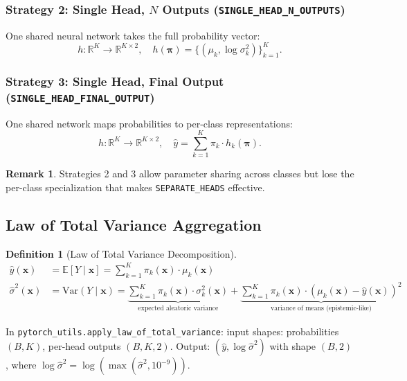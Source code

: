 \documentclass[11pt,a4paper]{article}
\theoremstyle{definition}
\newtheorem{definition}{Definition}[section]
\newtheorem{remark}{Remark}[section]
\newcommand{\E}{\mathbb{E}}
\newcommand{\Var}{\mathrm{Var}}
\newcommand{\R}{\mathbb{R}}
\newcommand{\bx}{\mathbf{x}}
\newcommand{\bpi}{\boldsymbol{\pi}}
\begin{document}
\subsubsection{Strategy 2: Single Head, $N$ Outputs (\texttt{SINGLE\_HEAD\_N\_OUTPUTS})}

One shared neural network takes the full probability vector:
\[
  h : \R^K \to \R^{K \times 2}, \quad h(\bpi) = \{(\mu_k, \log\sigma_k^2)\}_{k=1}^{K}.
\]

\subsubsection{Strategy 3: Single Head, Final Output (\texttt{SINGLE\_HEAD\_FINAL\_OUTPUT})}

One shared network maps probabilities to per-class representations:
\[
  h : \R^K \to \R^{K \times 2}, \quad
  \hat{y} = \sum_{k=1}^{K} \pi_k \cdot h_k(\bpi).
\]

\begin{remark}
Strategies 2 and 3 allow parameter sharing across classes but lose
the per-class specialization that makes \texttt{SEPARATE\_HEADS} effective.
\end{remark}

\subsection{Law of Total Variance Aggregation}

\begin{definition}[Law of Total Variance Decomposition]
\begin{align}
  \hat{y}(\bx) &= \E[Y \mid \bx] = \sum_{k=1}^{K} \pi_k(\bx) \cdot \mu_k(\bx)
  \label{eq:lotv_mean} \\[6pt]
  \hat{\sigma}^2(\bx) &= \Var(Y \mid \bx) = \underbrace{\sum_{k=1}^{K} \pi_k(\bx) \cdot \sigma_k^2(\bx)}_{\text{expected aleatoric variance}} + \underbrace{\sum_{k=1}^{K} \pi_k(\bx) \cdot (\mu_k(\bx) - \hat{y}(\bx))^2}_{\text{variance of means (epistemic-like)}}
  \label{eq:lotv_var}
\end{align}
\end{definition}

\begin{implnote}
In \texttt{pytorch\_utils.apply\_law\_of\_total\_variance}:
input shapes: probabilities $(B, K)$, per-head outputs $(B, K, 2)$.
Output: $(\hat{y}, \log\hat{\sigma}^2)$ with shape $(B, 2)$, where
$\log\hat{\sigma}^2 = \log(\max(\hat{\sigma}^2, 10^{-9}))$.
\end{implnote}
\end{document}
